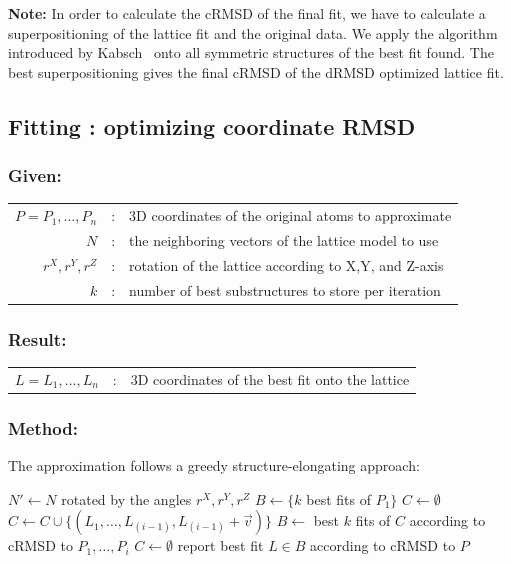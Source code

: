 \documentclass{article}
\begin{document}
{\bfseries Note:} In order to calculate the cRMSD of the final fit, we have to
calculate a superpositioning of the lattice fit and the original data. We apply
the algorithm introduced by Kabsch~\cite{Kabsch:76,Kabsch:78} onto
all symmetric structures of the best fit found. The best superpositioning gives
the final cRMSD of the dRMSD optimized lattice fit. 



\subsection{Fitting : optimizing coordinate RMSD}
\label{sec:fit:cRMSD}

\subsubsection*{Given:}

\begin{tabular}{rcl}
	$P=P_1,\ldots,P_n$ &:& 3D coordinates of the original atoms to approximate \\
	$N$ &:& the neighboring vectors of the lattice model to use \\
	$r^X, r^Y, r^Z$ &:& rotation of the lattice according to X,Y, and Z-axis\\
	$k$ &:& number of best substructures to store per iteration
\end{tabular}

\subsubsection*{Result:}

\begin{tabular}{rcl}
	$L=L_1,\ldots,L_n$ &:& 3D coordinates of the best fit onto the lattice
\end{tabular}

\subsubsection*{Method:}

The approximation follows a greedy structure-elongating approach:

\vspace{0.5em}
\begin{algorithmic}[1]
	\State $N'\gets N$ rotated by the angles $r^X, r^Y, r^Z$
	\State $B \gets \{k$ best fits of $P_1\}$  \Statex {}
	\State $C \gets \emptyset$ 
		 
					\State $C \gets C \cup \{(L_1,\ldots,L_{(i-1)},L_{(i-1)} + \vec v)\}$
				\EndIf
			\EndFor
		\EndFor
		\State $B \gets $ best $k$ fits of $C$ according to cRMSD to
		$P_1,\ldots,P_{i}$ 
		\State $C \gets \emptyset$ 
	\EndFor
	\State report best fit $L \in B$ according to cRMSD to $P$
\end{algorithmic}
\end{document}

